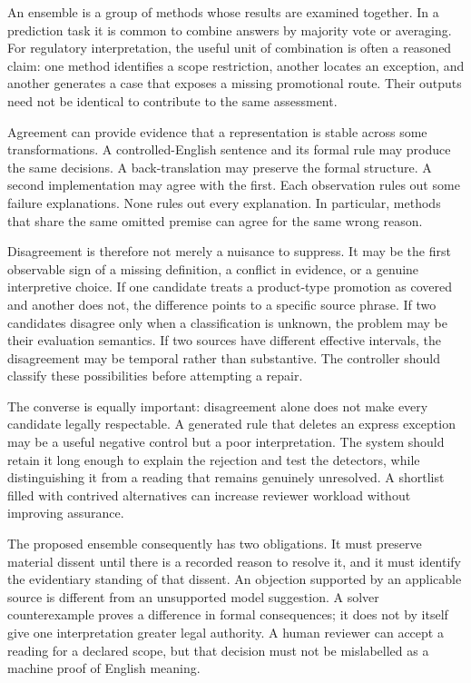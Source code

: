 \label{sec:problem-agreement}
An ensemble is a group of methods whose results are examined together. In a
prediction task it is common to combine answers by majority vote or averaging.
For regulatory interpretation, the useful unit of combination is often a
reasoned claim: one method identifies a scope restriction, another locates an
exception, and another generates a case that exposes a missing promotional route.
Their outputs need not be identical to contribute to the same assessment.

Agreement can provide evidence that a representation is stable across some
transformations. A controlled-English sentence and its formal rule may produce
the same decisions. A back-translation may preserve the formal structure. A
second implementation may agree with the first. Each observation rules out some
failure explanations. None rules out every explanation. In particular, methods
that share the same omitted premise can agree for the same wrong reason.

Disagreement is therefore not merely a nuisance to suppress. It may be the first
observable sign of a missing definition, a conflict in evidence, or a genuine
interpretive choice. If one candidate treats a product-type promotion as covered
and another does not, the difference points to a specific source phrase. If two
candidates disagree only when a classification is unknown, the problem may be
their evaluation semantics. If two sources have different effective intervals,
the disagreement may be temporal rather than substantive. The controller should
classify these possibilities before attempting a repair.


The converse is equally important: disagreement alone does not make every
candidate legally respectable. A generated rule that deletes an express exception
may be a useful negative control but a poor interpretation. The system should
retain it long enough to explain the rejection and test the detectors, while
distinguishing it from a reading that remains genuinely unresolved. A shortlist
filled with contrived alternatives can increase reviewer workload without
improving assurance.

The proposed ensemble consequently has two obligations. It must preserve
material dissent until there is a recorded reason to resolve it, and it must
identify the evidentiary standing of that dissent. An objection supported by an
applicable source is different from an unsupported model suggestion. A solver
counterexample proves a difference in formal consequences; it does not by itself
give one interpretation greater legal authority. A human reviewer can accept a
reading for a declared scope, but that decision must not be mislabelled as a
machine proof of English meaning.

